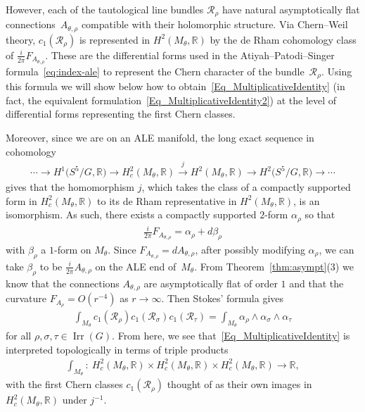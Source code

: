 \documentclass[pdftex]{sigma}
\numberwithin{equation}{section}
\newcommand{\cR}{\mathcal{R}}
\newcommand{\R}{{\mathbb R}}
\newcommand{\Irr}{\operatorname{Irr}}
\begin{document}
However, each of the tautological line bundles $\cR_{\rho}$
have natural asymptotically f\/lat connec\-tions~$A_{\theta, \rho}$
compatible with their holomorphic structure. Via Chern--Weil theory,
$c_1(\cR_{\rho})$ is represented in $H^2(M_{\theta},\R)$ by the de
Rham cohomology class of $ \frac{i}{2\pi}F_{A_{\theta,\rho}}$. These
are the dif\/ferential forms used in the Atiyah--Patodi--Singer
formula~\eqref{eq:index-ale} to represent the Chern character of the
bundle~$\cR_{\rho}$.  Using this formula we will show below how to
obtain~\eqref{Eq_MultiplicativeIdentity} (in fact, the equivalent formulation~\eqref{Eq_MultiplicativeIdentity2}) at the level of dif\/ferential forms
representing the f\/irst Chern classes.

Moreover, since we are on an ALE manifold, the long exact sequence in
cohomology
\begin{gather*}
  \cdots \to H^1\big(S^5/G,\R\big) \to H^2_{c}(M_{\theta},\R) \stackrel{j}\to
  H^2(M_{\theta},\R) \to H^2\big(S^5/G,\R\big) \to \cdots
\end{gather*}
gives that the homomorphism $j$, which takes the class of a compactly
supported form in $H^2_c(M_{\theta},\R)$ to its de Rham
representative in $H^2(M_{\theta},\R)$, is an isomorphism. As such,
there exists a compactly supported $2$-form $\alpha_{\rho}$ so that
\begin{gather*}
  \tfrac{i}{2\pi}F_{A_{\theta,\rho}} = \alpha_{\rho} + d\beta_{\rho}
\end{gather*}
with $\beta_{\rho}$ a $1$-form on $M_{\theta}$. Since
$F_{A_{\theta,\rho}} = dA_{\theta, \rho}$, after possibly modifying
$\alpha_{\rho}$, we can take $\beta_{\rho}$ to be $\frac{i}{2\pi}
A_{\theta, \rho}$ on the ALE end of~$M_{\theta}$. From
Theorem~\ref{thm:asympt}(3) we know that the
connections $A_{\theta,\rho}$ are asymptotically f\/lat of order $1$ and
that the curvature $F_{A_{\rho}} = O(r^{-4})$ as $r\to \infty$. Then
Stokes' formula gives
\begin{gather*}
  \int_{M_{\theta}} c_1(\cR_{\rho}) c_1(\cR_{\sigma}) c_1 (\cR_{\tau})
  = \int_{M_{\theta}} \alpha_{\rho} \wedge \alpha_{\sigma} \wedge
  \alpha_{\tau}
\end{gather*}
for all $\rho, \sigma, \tau \in \Irr(G)$.  From here, we see
that~\eqref{Eq_MultiplicativeIdentity} is interpreted topologically in terms of
triple products
\begin{gather*}
  \int_{M_\theta}\colon \ H^2_c(M_{\theta},\R) \times H^2_c(M_{\theta},\R) \times H^2_c(M_{\theta},\R) \to \R,
\end{gather*}
with the f\/irst Chern classes $c_1(\cR_{\rho})$ thought of as their own
images in $H^2_c(M_{\theta},\R)$ under $j^{-1}$.
\end{document}

